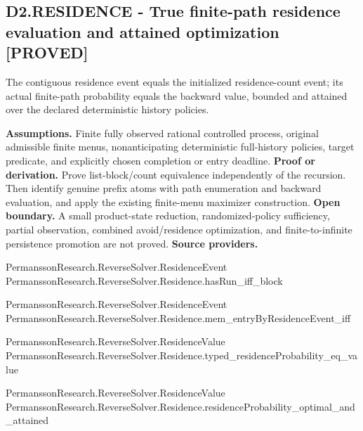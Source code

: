 \documentclass[11pt,a4paper]{article}
\begin{document}
\subsection*{D2.RESIDENCE - True finite-path residence evaluation and attained optimization [PROVED]}
The contiguous residence event equals the initialized residence-count event; its actual finite-path probability equals the backward value, bounded and attained over the declared deterministic history policies.

\textbf{Assumptions.} Finite fully observed rational controlled process, original admissible finite menus, nonanticipating deterministic full-history policies, target predicate, and explicitly chosen completion or entry deadline.
\textbf{Proof or derivation.} Prove list-block/count equivalence independently of the recursion. Then identify genuine prefix atoms with path enumeration and backward evaluation, and apply the existing finite-menu maximizer construction.
\textbf{Open boundary.} A small product-state reduction, randomized-policy sufficiency, partial observation, combined avoid/residence optimization, and finite-to-infinite persistence promotion are not proved.
\textbf{Source providers.}
{\footnotesize\raggedright PermanssonRe\allowbreak{}search.Rever\allowbreak{}seSolver.Res\allowbreak{}idenceEvent\\ PermanssonRe\allowbreak{}search.Rever\allowbreak{}seSolver.Res\allowbreak{}idence.hasRu\allowbreak{}n\_iff\_block\par}
{\footnotesize\raggedright PermanssonRe\allowbreak{}search.Rever\allowbreak{}seSolver.Res\allowbreak{}idenceEvent\\ PermanssonRe\allowbreak{}search.Rever\allowbreak{}seSolver.Res\allowbreak{}idence.mem\_e\allowbreak{}ntryByReside\allowbreak{}nceEvent\_iff\par}
{\footnotesize\raggedright PermanssonRe\allowbreak{}search.Rever\allowbreak{}seSolver.Res\allowbreak{}idenceValue\\ PermanssonRe\allowbreak{}search.Rever\allowbreak{}seSolver.Res\allowbreak{}idence.typed\allowbreak{}\_residencePr\allowbreak{}obability\_eq\allowbreak{}\_value\par}
{\footnotesize\raggedright PermanssonRe\allowbreak{}search.Rever\allowbreak{}seSolver.Res\allowbreak{}idenceValue\\ PermanssonRe\allowbreak{}search.Rever\allowbreak{}seSolver.Res\allowbreak{}idence.resid\allowbreak{}enceProbabil\allowbreak{}ity\_optimal\_\allowbreak{}and\_attained\par}
\end{document}
